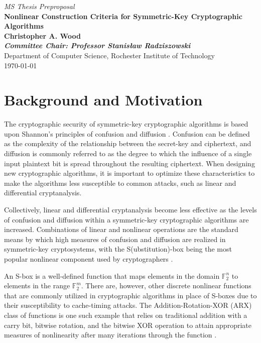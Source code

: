 \documentclass[10pt]{article}
\newcommand{\field}[1]{\mathbb{#1}} %
\begin{document}
\thispagestyle{empty} 
\begin{center}
{\em MS Thesis Preproposal}\\
{\large \bf Nonlinear Construction Criteria for Symmetric-Key Cryptographic Algorithms}\\
{\bf Christopher A. Wood}\\
{\bf \it Committee Chair: Professor Stanis{\l}aw Radziszowski}\\
Department of Computer Science, Rochester Institute of Technology\\
\today{}\\
\end{center}

\section{Background and Motivation}
The cryptographic security of symmetric-key cryptographic algorithms is based upon Shannon's principles of confusion and diffusion \cite{Kim90astudy}. Confusion can be defined as the complexity of the relationship between the secret-key and ciphertext, and diffusion is commonly referred to as the degree to which the influence of a single input plaintext bit is spread throughout the resulting ciphertext. When designing new cryptographic algorithms, it is important to optimize these characteristics to make the algorithms less susceptible to common attacks, such as linear and differential cryptanalysis.

Collectively, linear and differential cryptanalysis become less effective as the levels of confusion and diffusion within a symmetric-key cryptographic algorithms are increased. Combinations of linear and nonlinear operations are the standard means by which high measures of confusion and diffusion are realized in symmetric-key cryptosystems, with the S(ubstitution)-box being the most popular nonlinear component used by cryptographers \cite{AESBook}. 

An S-box is a well-defined function that maps elements in the domain $\field{F}_2^n$ to elements in the range $\field{F}_2^m$. There are, however, other discrete nonlinear functions that are commonly utilized in cryptographic algorithms in place of S-boxes due to their susceptibility to cache-timing attacks. The Addition-Rotation-XOR (ARX) class of functions is one such example that relies on traditional addition with a carry bit, bitwise rotation, and the bitwise XOR operation to attain appropriate measures of nonlinearity after many iterations through the function \cite{arxProb}.
\end{document}
